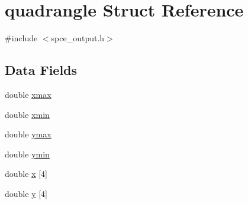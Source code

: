 \hypertarget{structquadrangle}{
\section{quadrangle Struct Reference}
\label{structquadrangle}
}


{\ttfamily \#include $<$spce\_\-output.h$>$}\subsection*{Data Fields}
\begin{DoxyCompactItemize}
\item 
double \hyperlink{structquadrangle_a07cdc1aa08d997f3ecf4a4527e1958b1}{xmax}
\item 
double \hyperlink{structquadrangle_a4a693bbae5ab2389a2e89aba2cd1ec6c}{xmin}
\item 
double \hyperlink{structquadrangle_a9cd9de4d5ad81c686c3bbea6093d5f2a}{ymax}
\item 
double \hyperlink{structquadrangle_a28f1d44685c1b1fc1302c23fa53e3c82}{ymin}
\item 
double \hyperlink{structquadrangle_a2838cc41fa0d8d867757b05ed1cfdbc2}{x} \mbox{[}4\mbox{]}
\item 
double \hyperlink{structquadrangle_a7a086b8fde718d39d81a1d0a5855beff}{y} \mbox{[}4\mbox{]}
\end{DoxyCompactItemize}


